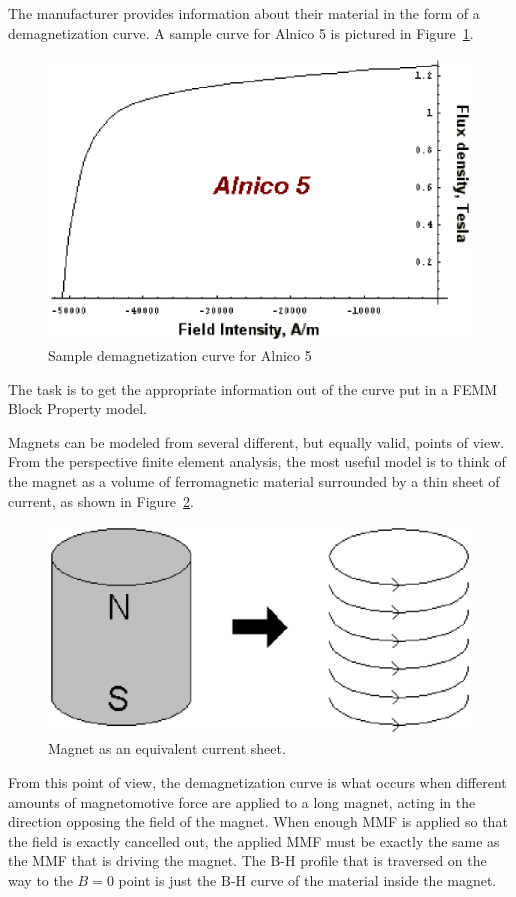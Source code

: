 \documentclass[12pt]{report}
\begin{document}
The manufacturer provides information about their material in the
form of a demagnetization curve.  A sample curve for Alnico 5 is
pictured in Figure~\ref{al5}.
\begin{figure}
\centerline{\includegraphics{manf.ps}}
\caption{Sample demagnetization curve for Alnico 5}
\label{al5}
\end{figure}
The task is to get the appropriate information out of the curve put
in a FEMM Block Property model.

Magnets can be modeled from several different, but equally valid,
points of view.  From the perspective finite element analysis, the
most useful model is to think of the magnet as a volume of
ferromagnetic material surrounded by a thin sheet of current, as
shown in Figure~\ref{currentsheet}.
\begin{figure}
\centerline{\includegraphics{eqmag.ps}}
\caption{Magnet as an equivalent current sheet.}
\label{currentsheet}
\end{figure}
From this point of view, the demagnetization curve is what occurs
when different amounts of magnetomotive force are applied to a long
magnet, acting in the direction opposing the field of the magnet.
When enough MMF is applied so that the field is exactly cancelled
out, the applied MMF must be exactly the same as the MMF that is
driving the magnet.  The B-H profile that is traversed on the way
to the $B=0$ point is just the B-H curve of the material inside the
magnet.
\end{document}
